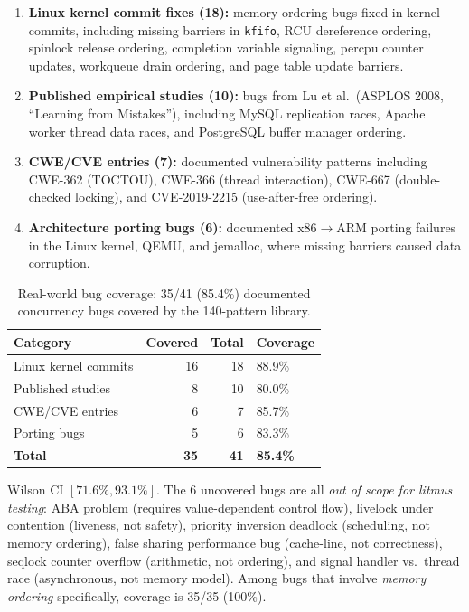 \documentclass[11pt]{article}
\begin{document}
\begin{enumerate}[nosep]
\item \textbf{Linux kernel commit fixes (18):} memory-ordering bugs
  fixed in kernel commits, including missing barriers in
  \texttt{kfifo}, RCU dereference ordering, spinlock release
  ordering, completion variable signaling, percpu counter updates,
  workqueue drain ordering, and page table update barriers.
\item \textbf{Published empirical studies (10):} bugs from
  Lu et al.~(ASPLOS 2008, ``Learning from Mistakes''),
  including MySQL replication races, Apache worker thread
  data races, and PostgreSQL buffer manager ordering.
\item \textbf{CWE/CVE entries (7):} documented vulnerability
  patterns including CWE-362 (TOCTOU), CWE-366 (thread
  interaction), CWE-667 (double-checked locking), and
  CVE-2019-2215 (use-after-free ordering).
\item \textbf{Architecture porting bugs (6):} documented x86$\to$ARM
  porting failures in the Linux kernel, QEMU, and jemalloc,
  where missing barriers caused data corruption.
\end{enumerate}

\begin{table}[ht]
\centering
\caption{Real-world bug coverage: 35/41 (85.4\%) documented
concurrency bugs covered by the 140-pattern library.}
\label{tab:bug-coverage}
\small
\begin{tabular}{lrrl}
\toprule
\textbf{Category} & \textbf{Covered} & \textbf{Total} & \textbf{Coverage} \\
\midrule
Linux kernel commits     & 16 & 18 & 88.9\% \\
Published studies        & 8  & 10 & 80.0\% \\
CWE/CVE entries          & 6  & 7  & 85.7\% \\
Porting bugs             & 5  & 6  & 83.3\% \\
\midrule
\textbf{Total}           & \textbf{35} & \textbf{41} & \textbf{85.4\%} \\
\bottomrule
\end{tabular}
\end{table}

\noindent
Wilson CI $[71.6\%, 93.1\%]$.
The 6 uncovered bugs are all \emph{out of scope for litmus testing}:
ABA problem (requires value-dependent control flow),
livelock under contention (liveness, not safety),
priority inversion deadlock (scheduling, not memory ordering),
false sharing performance bug (cache-line, not correctness),
seqlock counter overflow (arithmetic, not ordering),
and signal handler vs.\ thread race (asynchronous, not memory model).
Among bugs that involve \emph{memory ordering} specifically,
coverage is 35/35 (100\%).
\end{document}
